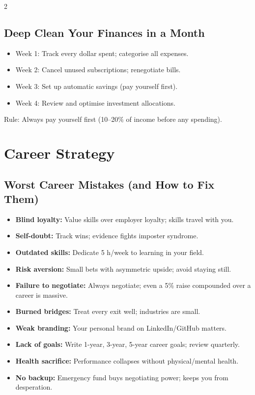 \documentclass[10pt,a4paper]{article}
\begin{document}
\begin{multicols}{2}
\subsection{Deep Clean Your Finances in a Month}
\begin{itemize}
\item Week 1: Track every dollar spent; categorise all expenses.
\item Week 2: Cancel unused subscriptions; renegotiate bills.
\item Week 3: Set up automatic savings (pay yourself first).
\item Week 4: Review and optimise investment allocations.
\end{itemize}
Rule: Always pay yourself first (10--20\% of income before any spending).

\section{Career Strategy}

\subsection{Worst Career Mistakes (and How to Fix Them)}
\begin{itemize}
\item \textbf{Blind loyalty:} Value skills over employer loyalty; skills travel with you.
\item \textbf{Self-doubt:} Track wins; evidence fights imposter syndrome.
\item \textbf{Outdated skills:} Dedicate 5 h/week to learning in your field.
\item \textbf{Risk aversion:} Small bets with asymmetric upside; avoid staying still.
\item \textbf{Failure to negotiate:} Always negotiate; even a 5\% raise compounded over a career is massive.
\item \textbf{Burned bridges:} Treat every exit well; industries are small.
\item \textbf{Weak branding:} Your personal brand on LinkedIn/GitHub matters.
\item \textbf{Lack of goals:} Write 1-year, 3-year, 5-year career goals; review quarterly.
\item \textbf{Health sacrifice:} Performance collapses without physical/mental health.
\item \textbf{No backup:} Emergency fund buys negotiating power; keeps you from desperation.
\end{itemize}


\end{multicols}
\end{document}
